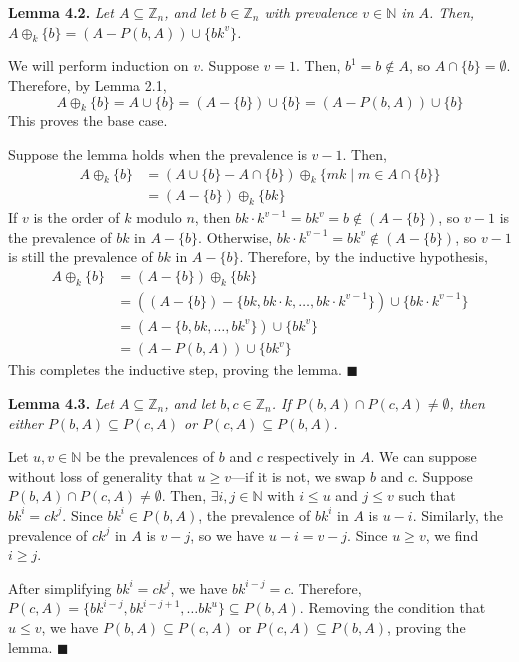 \documentclass{article}
\newcommand{\zee}{\mathbb{Z}}
\newcommand{\N}{\mathbb{N}}
\begin{document}
\textbf{Lemma 4.2.} \textit{Let $A \subseteq \zee_n$, and
let $b \in \zee_n$ with prevalence $v \in \N$ in $A$.
Then,
$A \oplus_k \{b\} = (A - P(b, A)) \cup \{bk^v\}$.}

We will perform induction on $v$. Suppose $v = 1$.
Then, $b^1 = b \not\in A$, so $A \cap \{b\} = \emptyset$.
Therefore, by Lemma 2.1,
\[A \oplus_k \{b\} = A \cup \{b\} = (A - \{b\}) \cup \{b\}
= (A - P(b, A)) \cup \{b\}\]
This proves the base case.

Suppose the lemma holds when the prevalence is $v-1$. Then,
\[\begin{split}
    A \oplus_k \{b\} &=
    (A \cup \{b\} - A \cap \{b\})
        \oplus_k \{mk \mid m \in A \cap \{b\}\} \\
    &= (A - \{b\}) \oplus_k \{bk\}
\end{split}\]
If $v$ is the order of $k$ modulo $n$, then
$bk \cdot k^{v-1} = bk^v = b \not\in (A - \{b\})$,
so $v-1$ is the prevalence of $bk$ in $A - \{b\}$.
Otherwise, $bk \cdot k^{v-1} = bk^v \not\in (A - \{b\})$,
so $v-1$ is still the prevalence of $bk$ in
$A - \{b\}$. Therefore, by the inductive hypothesis,
\[\begin{split}
    A \oplus_k \{b\}
    &= (A - \{b\}) \oplus_k \{bk\} \\
    &= ((A - \{b\})
        - \{bk, bk \cdot k, \ldots, bk \cdot k^{v-1}\})
        \cup \{bk \cdot k^{v-1}\} \\
    &= (A - \{b, bk, \ldots, bk^v\}) \cup \{bk^v\} \\
    &= (A - P(b, A)) \cup \{bk^v\}
\end{split}\]
This completes the inductive step, proving the lemma. $\blacksquare$

\textbf{Lemma 4.3.} \textit{Let $A \subseteq \zee_n$, and
let $b, c \in \zee_n$.
If $P(b, A) \cap P(c, A) \neq \emptyset$, then
either $P(b, A) \subseteq P(c, A)$ or $P(c, A) \subseteq P(b, A)$.}

Let $u, v \in \N$ be the prevalences of $b$ and $c$ respectively in $A$.
We can suppose without loss of generality that $u \geq v$---if it is not,
we swap $b$ and $c$.
Suppose $P(b, A) \cap P(c, A) \neq \emptyset$. Then,
$\exists i, j \in \N$ with $i \leq u$ and $j \leq v$
such that $bk^i = ck^j$. Since $bk^i \in P(b, A)$, the prevalence of
$bk^i$ in $A$ is $u - i$. Similarly, the prevalence of $ck^j$ in $A$
is $v - j$, so we have $u - i = v - j$. Since $u \geq v$, we find
$i \geq j$.

After simplifying $bk^i = ck^j$, we have $bk^{i-j} = c$. Therefore,
$P(c, A) = \{bk^{i-j}, bk^{i-j+1}, \ldots bk^u\} \subseteq P(b, A)$.
Removing the condition that $u \leq v$, we have
$P(b, A) \subseteq P(c, A)$ or $P(c, A) \subseteq P(b, A)$,
proving the lemma.
$\blacksquare$
\end{document}
